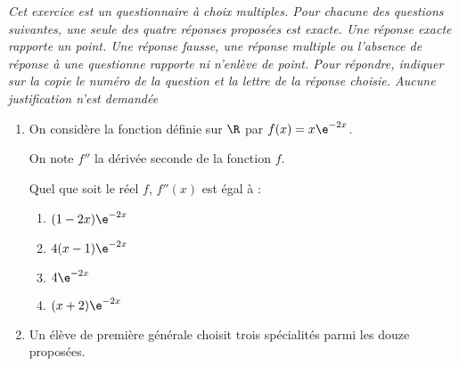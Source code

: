 \textit{Cet exercice est un questionnaire à choix multiples. Pour chacune des questions suivantes, une seule des quatre réponses proposées est exacte. Une réponse exacte rapporte un point. Une réponse fausse, une réponse multiple ou l'absence de réponse à une questionne rapporte ni n'enlève de point. Pour répondre, indiquer sur la copie le numéro de la question et la lettre de la réponse choisie. Aucune justification n'est demandée}

\smallskip

\begin{enumerate}
	\item On considère la fonction définie sur $\R$ par $f(x)=x\e^{-2x}$.
	
	On note $f''$ la dérivée seconde de la fonction $f$.
	
	Quel que soit le réel $f$, $f''(x)$ est égal à :
	\begin{enumerate}
		\item $(1-2x)\e^{-2x}$
		\item $4(x-1)\e^{-2x}$
		\item $4\e^{-2x}$
		\item $(x+2)\e^{-2x}$
	\end{enumerate}
	\item Un élève de première générale choisit trois spécialités parmi les douze proposées.
	

\end{enumerate}
